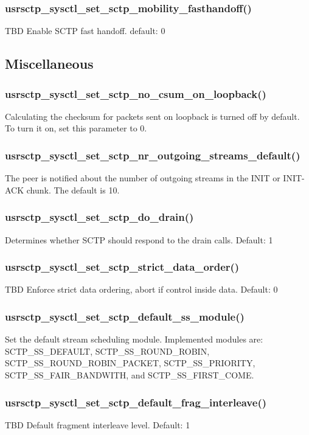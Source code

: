 \documentclass[a4paper]{article}
\begin{document}
\subsubsection{usrsctp\_sysctl\_set\_sctp\_mobility\_fasthandoff()}
TBD
Enable SCTP fast handoff. default: 0


\subsection{Miscellaneous}
\subsubsection{usrsctp\_sysctl\_set\_sctp\_no\_csum\_on\_loopback()}
Calculating the checksum for packets sent on loopback is turned off by default.
To turn it on, set this parameter to 0.

\subsubsection{usrsctp\_sysctl\_set\_sctp\_nr\_outgoing\_streams\_default()}
The peer is notified about the number of outgoing streams in the INIT or INIT-ACK chunk.
The default is 10. 

\subsubsection{usrsctp\_sysctl\_set\_sctp\_do\_drain()}
Determines whether SCTP should respond to the drain calls. Default: 1		

\subsubsection{usrsctp\_sysctl\_set\_sctp\_strict\_data\_order()}
TBD
Enforce strict data ordering, abort if control inside data. Default: 0

\subsubsection{usrsctp\_sysctl\_set\_sctp\_default\_ss\_module()}
Set the default stream scheduling module. Implemented modules are:
SCTP\_SS\_DEFAULT, SCTP\_SS\_ROUND\_ROBIN, SCTP\_SS\_ROUND\_ROBIN\_PACKET,
SCTP\_SS\_PRIORITY, SCTP\_SS\_FAIR\_BANDWITH, and SCTP\_SS\_FIRST\_COME.

\subsubsection{usrsctp\_sysctl\_set\_sctp\_default\_frag\_interleave()}
TBD
Default fragment interleave level. Default: 1
\end{document}
